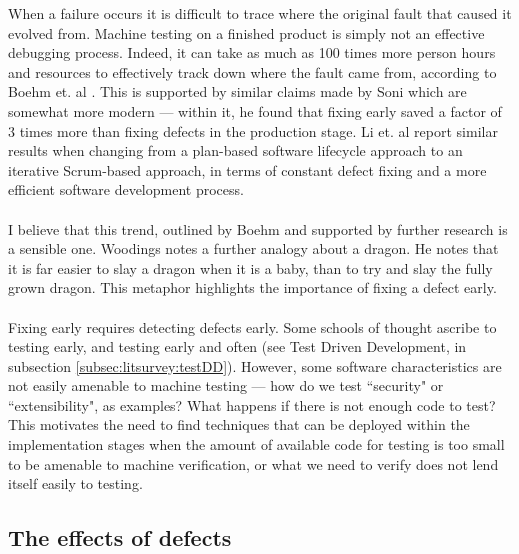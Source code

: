When a failure occurs it is difficult to trace where the original fault that caused it evolved from.
Machine testing on a finished product is simply not an effective debugging process.
Indeed, it can take as much as 100 times more person hours and resources to effectively track down
where the fault came from, according to Boehm et. al \cite{boehm2005foundations}.
This is supported by similar claims made by Soni \cite{soni2006defect} which are somewhat more
modern --- within it, he found that fixing early saved a factor of 3 times more than fixing defects
in the production stage.
Li et. al \cite{li2010transition} report similar results when changing from a plan-based software
lifecycle approach to an iterative Scrum-based approach, in terms of constant defect fixing and a
more efficient software development process.\\
\\
I believe that this trend, outlined by Boehm and supported by further research is a sensible one.
Woodings \cite{terryLecture4220} notes a further analogy about a dragon.
He notes that it is far easier to slay a dragon when it is a baby, than to try and slay the fully
grown dragon.
This metaphor highlights the importance of fixing a defect early.\\
\\
Fixing early requires detecting defects early.
Some schools of thought ascribe to testing early, and testing early and often (see Test Driven Development, in
subsection \ref{subsec:litsurvey:testDD}).
However, some software characteristics are not easily amenable to machine testing --- how do we test
``security" or ``extensibility", as examples?
What happens if there is not enough code to test?
This motivates the need to find techniques that can be deployed within the implementation stages
when the amount of available code for testing is too small to be amenable to machine verification,
or what we need to verify does not lend itself easily to testing.

\subsection{The effects of defects} \label{subsec:litsurvey:effects}


